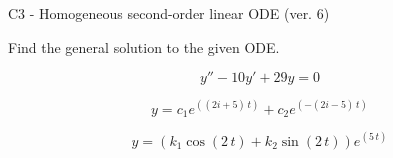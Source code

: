 \begin{exercise}
  \begin{exerciseTitle}C3 - Homogeneous second-order linear ODE (ver. 6)\end{exerciseTitle}
  \begin{exerciseStatement}
    
Find the general solution to the given ODE.

    
\[y''-10y'+29y = 0\]

  \end{exerciseStatement}
  \begin{exerciseAnswer}
    
\[y= c_{1} e^{\left(\left(2 i + 5\right) \, t\right)} + c_{2} e^{\left(-\left(2 i - 5\right) \, t\right)}\]

    
\[y= {\left(k_{1} \cos\left(2 \, t\right) + k_{2} \sin\left(2 \, t\right)\right)} e^{\left(5 \, t\right)}\]

  \end{exerciseAnswer}
\end{exercise}